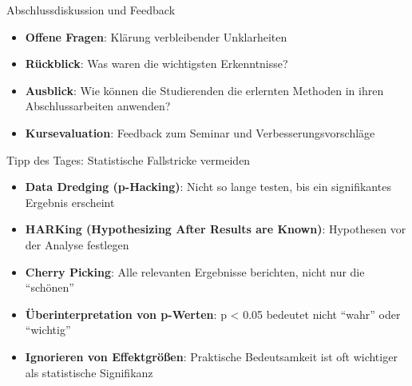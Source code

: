 \documentclass[
  ignorenonframetext,
]{beamer}
\providecommand{\tightlist}{%
  \setlength{\itemsep}{0pt}\setlength{\parskip}{0pt}}
\begin{document}
\begin{frame}{Abschlussdiskussion und Feedback}
\protect{}\label{abschlussdiskussion-und-feedback}
\begin{itemize}
\tightlist
\item
  \textbf{Offene Fragen}: Klärung verbleibender Unklarheiten
\item
  \textbf{Rückblick}: Was waren die wichtigsten Erkenntnisse?
\item
  \textbf{Ausblick}: Wie können die Studierenden die erlernten Methoden
  in ihren Abschlussarbeiten anwenden?
\item
  \textbf{Kursevaluation}: Feedback zum Seminar und
  Verbesserungsvorschläge
\end{itemize}
\end{frame}

\begin{frame}{Tipp des Tages: Statistische Fallstricke vermeiden}
\protect{}\label{tipp-des-tages-statistische-fallstricke-vermeiden}
\begin{itemize}
\tightlist
\item
  \textbf{Data Dredging (p-Hacking)}: Nicht so lange testen, bis ein
  signifikantes Ergebnis erscheint
\item
  \textbf{HARKing (Hypothesizing After Results are Known)}: Hypothesen
  vor der Analyse festlegen
\item
  \textbf{Cherry Picking}: Alle relevanten Ergebnisse berichten, nicht
  nur die ``schönen''
\item
  \textbf{Überinterpretation von p-Werten}: p \textless{} 0.05 bedeutet
  nicht ``wahr'' oder ``wichtig''
\item
  \textbf{Ignorieren von Effektgrößen}: Praktische Bedeutsamkeit ist oft
  wichtiger als statistische Signifikanz
\end{itemize}
\end{frame}
\end{document}
